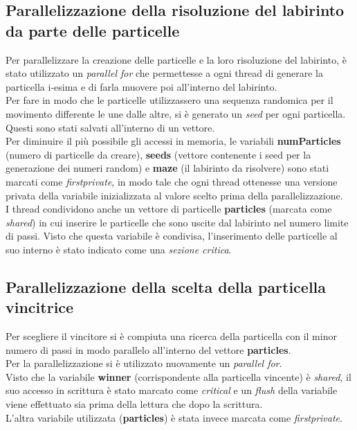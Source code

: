 \documentclass[10pt,twocolumn,letterpaper]{article}
\begin{document}
\subsection{Parallelizzazione della risoluzione del labirinto da parte delle particelle}
Per parallelizzare la creazione delle particelle e la loro risoluzione del labirinto, è stato utilizzato un \textit{parallel for} che permettesse a ogni thread di generare la particella i-esima e di farla muovere poi all'interno del labirinto.\\
Per fare in modo che le particelle utilizzassero una sequenza randomica per il movimento differente le une dalle altre, si è generato un \textit{seed} per ogni particella. Questi sono stati salvati all'interno di un vettore.\\
Per diminuire il più possibile gli accessi in memoria, le variabili \textbf{numParticles} (numero di particelle da creare), \textbf{seeds} (vettore contenente i seed per la generazione dei numeri random) e \textbf{maze} (il labirinto da risolvere) sono stati marcati come \textit{firstprivate}, in modo tale che ogni thread ottenesse una versione privata della variabile inizializzata al valore scelto prima della parallelizzazione.\\
I thread condividono anche un vettore di particelle \textbf{particles} (marcata come \textit{shared}) in cui inserire le particelle che sono uscite dal labirinto nel numero limite di passi. Visto che questa variabile è condivisa, l'inserimento delle particelle al suo interno è stato indicato come una \textit{sezione critica}.

\subsection{Parallelizzazione della scelta della particella vincitrice}
Per scegliere il vincitore si è compiuta una ricerca della particella con il minor numero di passi in modo parallelo all'interno del vettore \textbf{particles}.\\
Per la parallelizzazione si è utilizzato nuovamente un \textit{parallel for}.\\
Visto che la variabile \textbf{winner} (corrispondente alla particella vincente) è \textit{shared}, il suo accesso in scrittura è stato marcato come \textit{critical} e un \textit{flush} della variabile viene effettuato sia prima della lettura che dopo la scrittura.\\
L'altra variabile utilizzata (\textbf{particles}) è stata invece marcata come \textit{firstprivate}.
\end{document}
